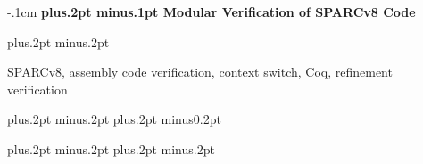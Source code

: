 \documentclass[twoside]{article}
\def\title#1{\vspace{3mm}\begin{flushleft}\vglue-.1cm\Large\bf\boldmath\protect\baselineskip=18pt plus.2pt minus.1pt #1
\end{flushleft}\vspace{1mm} }
\def\author#1{\begin{flushleft}\normalsize #1\end{flushleft}\vspace*{-4pt} \vspace{3mm}}
\def\address#1#2{\begin{flushleft}\vglue-.35cm${}^{#1}$\small\it #2\vglue-.35cm\end{flushleft}\vspace{-2mm}\par}
\begin{document}
\begin{CJK*}{GBK}{song}
\thispagestyle{empty}
\vspace*{-13mm}
\vspace*{2mm}

\title{Modular Verification of SPARCv8 Code}







\let\thefootnote\relax{}

  \baselineskip=18pt plus.2pt minus.2pt
  \quad 

\vspace*{3mm}

 \quad
{\small SPARCv8, assembly code verification, context switch,
  Coq, refinement verification}

\vspace*{4mm}

\end{CJK*}
\baselineskip=18pt plus.2pt minus.2pt
\parskip=0pt plus.2pt minus0.2pt

\begin{multicols}{2}
  \balance
  
  
  
  
  
  

  {
    \footnotesize
    \itemsep=-3pt plus.2pt minus.2pt
    \baselineskip=13pt plus.2pt minus.2pt
    }
\end{multicols}

%   
%   
%   
%   
\end{document}

